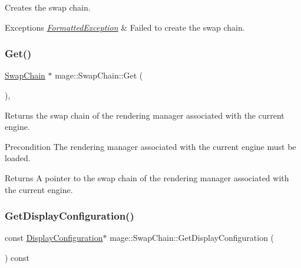 Creates the swap chain.


\begin{DoxyExceptions}{Exceptions}
{\em \hyperlink{structmage_1_1_formatted_exception}{Formatted\+Exception}} & Failed to create the swap chain. \\
\hline
\end{DoxyExceptions}
\hypertarget{classmage_1_1_swap_chain_a9ed25cd34dedc97e25e26e58456ac2fe}{}\label{classmage_1_1_swap_chain_a9ed25cd34dedc97e25e26e58456ac2fe} 
\subsubsection{\texorpdfstring{Get()}{Get()}}
{\footnotesize\ttfamily \hyperlink{classmage_1_1_swap_chain}{Swap\+Chain} $\ast$ mage\+::\+Swap\+Chain\+::\+Get (\begin{DoxyParamCaption}{ }\end{DoxyParamCaption})\hspace{0.3cm}{\ttfamily [static]}, {\ttfamily [noexcept]}}

Returns the swap chain of the rendering manager associated with the current engine.

\begin{DoxyPrecond}{Precondition}
The rendering manager associated with the current engine must be loaded. 
\end{DoxyPrecond}
\begin{DoxyReturn}{Returns}
A pointer to the swap chain of the rendering manager associated with the current engine. 
\end{DoxyReturn}
\hypertarget{classmage_1_1_swap_chain_afb7cf408081f09d0241f3e764a047e74}{}\label{classmage_1_1_swap_chain_afb7cf408081f09d0241f3e764a047e74} 
\subsubsection{\texorpdfstring{Get\+Display\+Configuration()}{GetDisplayConfiguration()}}
{\footnotesize\ttfamily const \hyperlink{structmage_1_1_display_configuration}{Display\+Configuration}$\ast$ mage\+::\+Swap\+Chain\+::\+Get\+Display\+Configuration (\begin{DoxyParamCaption}{ }\end{DoxyParamCaption}) const\hspace{0.3cm}{\ttfamily [noexcept]}}

